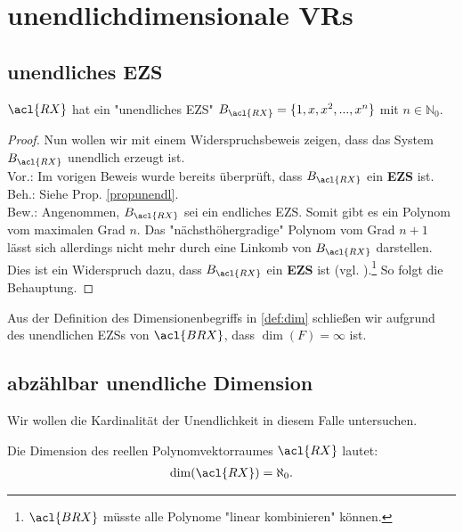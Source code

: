 \section{unendlichdimensionale \aclp{VR}}
\subsection*{unendliches \acl{EZS}}

\theoremstyle{prop}
\begin{prop} \label{propunendl}$\acl{RX}$ hat ein "unendliches \acl{EZS}" \cite[S.498 f.]{Enzy} $B_{\acl{RX}}=\{1,x,x^2,...,x^n\}$ mit $n \in \mathbb{N}_0$.
\end{prop}


\begin{proof}
Nun wollen wir mit einem Widerspruchsbeweis zeigen, dass das System $B_{\acl{RX}}$ unendlich erzeugt ist.
\\Vor.: Im vorigen Beweis wurde bereits überprüft, dass $B_{\acl{RX}}$ ein \textbf{\acl{EZS}} ist. 
\\Beh.: Siehe Prop. \ref{propunendl}.
\\Bew.: Angenommen, $B_{\acl{RX}}$ sei ein endliches \acl{EZS}. Somit gibt es ein Polynom vom maximalen Grad $n$. Das "nächsthöhergradige" Polynom vom Grad $n+1$ lässt sich allerdings nicht mehr durch eine \acl{Linkomb} von $B_{\acl{RX}}$ darstellen. Dies ist ein Widerspruch dazu, dass $B_{\acl{RX}}$ ein \textbf{\acl{EZS}} ist (vgl.  \cite[S.498 f.]{Enzy}).\footnote{$\acl{BRX}$ müsste alle Polynome "linear kombinieren" können.} So folgt die Behauptung.
\end{proof}

\theoremstyle{Corollar}
\begin{Corollar}{ }
Aus der Definition des Dimensionenbegriffs in \ref{def:dim} schließen wir aufgrund des unendlichen \acl{EZS}s von $\acl{BRX}$, dass $\dim(F)= \infty$ ist. 
\end{Corollar}

\subsection*{abzählbar unendliche Dimension}
Wir wollen die Kardinalität der Unendlichkeit in diesem Falle untersuchen.

\theoremstyle{prop}
\begin{prop}{ }
Die Dimension des reellen Polynomvektorraumes $\acl{RX}$ lautet: \begin{align*}\dim(\acl{RX})=\aleph_0\text{.} \end{align*}
\end{prop}

